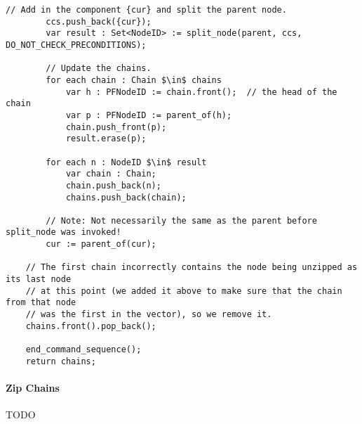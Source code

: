 \begin{stulisting}[p]
\begin{lstlisting}[style=Default]
		// Add in the component {cur} and split the parent node.
		ccs.push_back({cur});
		var result : Set<NodeID> := split_node(parent, ccs, DO_NOT_CHECK_PRECONDITIONS);

		// Update the chains.
		for each chain : Chain $\in$ chains
			var h : PFNodeID := chain.front();	// the head of the chain
			var p : PFNodeID := parent_of(h);
			chain.push_front(p);
			result.erase(p);

		for each n : NodeID $\in$ result
			var chain : Chain;
			chain.push_back(n);
			chains.push_back(chain);

		// Note: Not necessarily the same as the parent before split_node was invoked!
		cur := parent_of(cur);

	// The first chain incorrectly contains the node being unzipped as its last node
	// at this point (we added it above to make sure that the chain from that node
	// was the first in the vector), so we remove it.
	chains.front().pop_back();

	end_command_sequence();
	return chains;
\end{lstlisting}
\end{stulisting}

\paragraph{Zip Chains}

TODO

